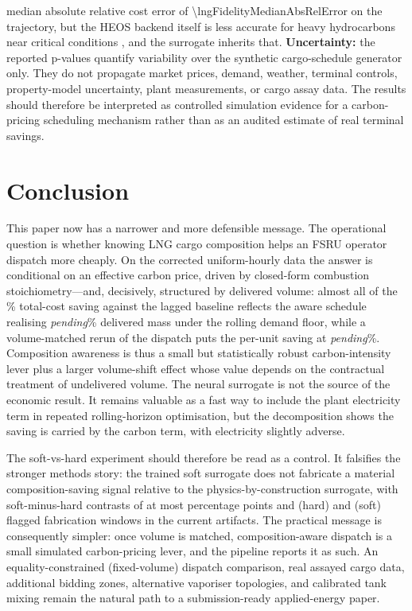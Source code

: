 \documentclass[11pt]{article}
\providecommand{\lngDecompDeliveredMassDeltaPct}{\emph{pending}}
\providecommand{\lngVolmatchSavingPct}{\emph{pending}}
\begin{document}
median absolute relative cost error of \num{\lngFidelityMedianAbsRelError} on
the trajectory, but the HEOS backend itself is less
accurate for heavy hydrocarbons near critical conditions
\citep{bell2014pure}, and the surrogate inherits that. \textbf{Uncertainty:}
the reported p-values quantify variability over the synthetic cargo-schedule
generator only. They do not propagate market prices, demand, weather, terminal
controls, property-model uncertainty, plant measurements, or cargo assay data.
The results should therefore be interpreted as controlled simulation evidence
for a carbon-pricing scheduling mechanism rather than as an audited estimate of
real terminal savings.

\section{Conclusion}
\label{sec:conclusion}

This paper now has a narrower and more defensible message. The operational
question is whether knowing LNG cargo composition helps an FSRU operator
dispatch more cheaply. On the corrected uniform-hourly data the answer is
conditional on an effective carbon price, driven by closed-form combustion
stoichiometry---and, decisively, structured by delivered volume: almost all of
the \lngHeadlineSavingVsLaggedPct\% total-cost saving against the lagged
baseline reflects the aware schedule realising
\lngDecompDeliveredMassDeltaPct\% delivered mass under the rolling demand
floor, while a volume-matched rerun of the dispatch puts the per-unit saving
at \lngVolmatchSavingPct\%. Composition awareness is thus a small but
statistically robust carbon-intensity lever plus a larger volume-shift effect
whose value depends on the contractual treatment of undelivered volume. The
neural surrogate is not the source of the economic result. It remains valuable
as a fast way to include the plant electricity term in repeated
rolling-horizon optimisation, but the decomposition shows the saving is
carried by the carbon term, with electricity slightly adverse.

The soft-vs-hard experiment should therefore be read as a control. It falsifies
the stronger methods story: the trained soft surrogate does not fabricate a
material composition-saving signal relative to the physics-by-construction
surrogate, with soft-minus-hard contrasts of at most \lngSvhMaxAbsContrastPp{}
percentage points and \lngFabHardFlaggedWindows{} (hard) and
\lngFabSoftFlaggedWindows{} (soft) flagged fabrication windows in the current
artifacts. The practical
message is consequently simpler: once volume is matched, composition-aware
dispatch is a small simulated carbon-pricing lever, and the pipeline reports
it as such. An equality-constrained (fixed-volume) dispatch comparison, real
assayed cargo data, additional bidding zones, alternative vaporiser
topologies, and calibrated tank mixing remain the natural path to a
submission-ready applied-energy paper.
\end{document}
